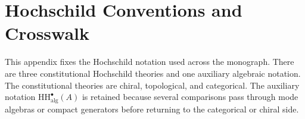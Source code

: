 \chapter{Hochschild Conventions and Crosswalk}
\label{app:hochschild-conventions}

\providecommand{\THH}{\mathrm{THH}}
\providecommand{\HHcat}{\mathrm{HH}_{\mathrm{cat}}}
\providecommand{\HHalg}{\mathrm{HH}_{\mathrm{alg}}}
\providecommand{\ChirHoch}{\mathrm{ChirHoch}}
\providecommand{\id}{\mathrm{id}}


This appendix fixes the Hochschild notation used across the monograph.
There are three constitutional Hochschild theories and one auxiliary
algebraic notation. The constitutional theories are chiral,
topological, and categorical. The auxiliary notation
$\HHalg^\bullet(A)$ is retained because several comparisons pass
through mode algebras or compact generators before returning to the
categorical or chiral side.

